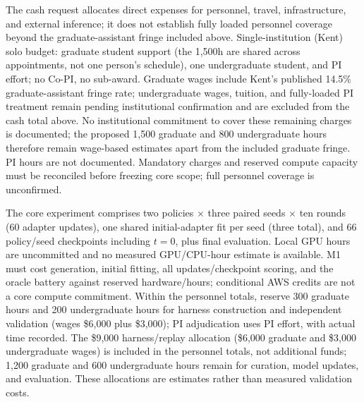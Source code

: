 \documentclass[11pt]{article}
\begin{document}
The cash request allocates direct expenses for personnel, travel, infrastructure, and external inference; it does not establish fully loaded personnel coverage beyond the graduate-assistant fringe included above. Single-institution (Kent) solo budget: graduate student support (the 1,500h are shared across appointments, not one person's schedule), one undergraduate student, and PI effort; no Co-PI, no sub-award. Graduate wages include Kent's published 14.5\% graduate-assistant fringe rate; undergraduate wages, tuition, and fully-loaded PI treatment remain pending institutional confirmation and are excluded from the cash total above. No institutional commitment to cover these remaining charges is documented; the proposed 1,500 graduate and 800 undergraduate hours therefore remain wage-based estimates apart from the included graduate fringe. PI hours are not documented. Mandatory charges and reserved compute capacity must be reconciled before freezing core scope; full personnel coverage is unconfirmed.

The core experiment comprises two policies $\times$ three paired seeds $\times$ ten rounds (60 adapter updates), one shared initial-adapter fit per seed (three total), and 66 policy/seed checkpoints including $t=0$, plus final evaluation. Local GPU hours are uncommitted and no measured GPU/CPU-hour estimate is available. M1 must cost generation, initial fitting, all updates/checkpoint scoring, and the oracle battery against reserved hardware/hours; conditional AWS credits are not a core compute commitment. Within the personnel totals, reserve 300 graduate hours and 200 undergraduate hours for harness construction and independent validation (wages \$6,000 plus \$3,000); PI adjudication uses PI effort, with actual time recorded. The \$9,000 harness/replay allocation (\$6,000 graduate and \$3,000 undergraduate wages) is included in the personnel totals, not additional funds; 1,200 graduate and 600 undergraduate hours remain for curation, model updates, and evaluation. These allocations are estimates rather than measured validation costs.
\end{document}
